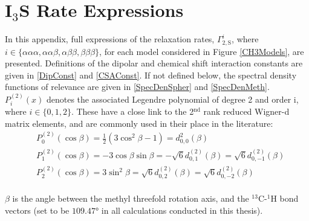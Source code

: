 \chapter{I$_3$S Rate Expressions}
\allowdisplaybreaks

\begin{appendixtext}
In this appendix, full expressions of the relaxation rates, $\Gamma_{2,\text{S}}^i$, where\\$i \in \{\alpha \alpha \alpha, \alpha \alpha\beta, \alpha\beta\beta, \beta\beta\beta\}$, for each model considered in Figure \ref{CH3Models}, are presented. Definitions of the dipolar and chemical shift interaction constants are given in \ref{DipConst} and \ref{CSAConst}. If not defined below, the spectral density functions of relevance are given in \ref{SpecDenSpher} and \ref{SpecDenMeth}. $P_i^{(2)} (x)$ denotes the associated Legendre polynomial of degree 2 and order i, where $i \in \{0, 1, 2\}$. These have a close link to the 2$^{\text{nd}}$ rank reduced Wigner-d matrix elements, and are commonly used in their place in the literature:
\begin{equation}
\begin{split}
&P_0^{(2)}(\cos \beta) = \frac{1}{2}\left( 3 \cos^2 \beta -1 \right) = d_{0,0}^{2} (\beta) \\
&P_1^{(2)}(\cos \beta) = -3\cos \beta \sin \beta = - \sqrt{6} d_{0,1}^{(2)}(\beta) = \sqrt{6} d_{0,-1}^{(2)}(\beta) \\
&P_2^{(2)}(\cos \beta) = 3\sin^2 \beta = \sqrt{6} d_{0,2}^{(2)}(\beta) = \sqrt{6} d_{0,-2}^{(2)}(\beta)
\end{split}
\end{equation}\\
 $\beta$ is the angle between the methyl threefold rotation axis, and the $^{13}$C-$^1$H bond vectors (set to be $\ang{109.47}$ in all calculations conducted in this thesis).

\end{appendixtext}
